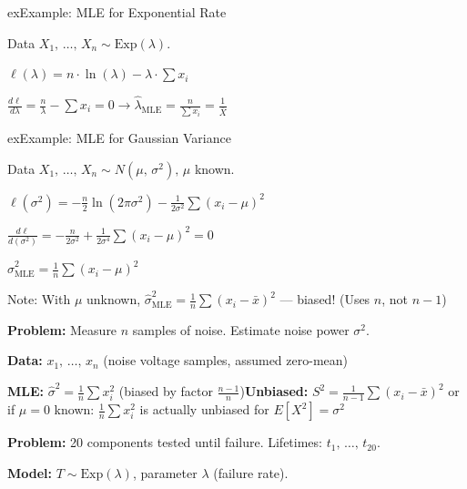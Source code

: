 \begin{PSbox}[unbreakable]{ex}{Example: MLE for Exponential Rate}

Data $X_{1},\, \ldots,\, X_{n} \sim \mathrm{Exp}(\lambda)$.

$\ell (\lambda) = n \cdot \ln (\lambda) - \lambda \cdot \sum x_{i}$

$\displaystyle \frac{d\ell}{d\lambda} = \frac{n}{\lambda} - \sum x_{i} = 0 \to \hat{\lambda}_{\mathrm{MLE}} = \frac{n}{\sum x_{i}} = \frac{1}{\bar{X}}$

\end{PSbox}

\begin{PSbox}[unbreakable]{ex}{Example: MLE for Gaussian Variance}

Data $X_{1},\, \ldots,\, X_{n} \sim N(\mu,\, \sigma^{2}),\, \mu$ known.

$\displaystyle \ell (\sigma^{2}) = -\frac{n}{2}\ln (2\pi \sigma^{2}) - \frac{1}{2\sigma^{2}}\sum (x_{i} - \mu)^{2}$

$\displaystyle \frac{d\ell}{d(\sigma^{2})} = -\frac{n}{2\sigma^{2}} + \frac{1}{2\sigma^{4}}\sum (x_{i} - \mu)^{2} = 0$

$\displaystyle \hat{\sigma}^{2}_{\mathrm{MLE}} = \frac{1}{n}\sum (x_{i} - \mu)^{2}$

Note: With $\mu$ unknown, $\hat{\sigma}^{2}_{\mathrm{MLE}} = \frac{1}{n}\sum (x_{i} - \bar{x})^{2}$ — biased! (Uses $n$, not $n-1$)

\end{PSbox}



\textbf{Problem:} Measure $n$ samples of noise. Estimate noise power $\sigma^{2}$.

\textbf{Data:} $x_{1},\, \ldots,\, x_{n}$ (noise voltage samples, assumed zero-mean)

\textbf{MLE:} $\hat{\sigma}^{2} = \frac{1}{n}\sum x_{i}^{2}$ (biased by factor $\frac{n-1}{n}$)\PSbr{}\textbf{Unbiased:} $S^{2} = \frac{1}{n-1}\sum (x_{i} - \bar{x})^{2}$ or if $\mu = 0$ known: $\frac{1}{n}\sum x_{i}^{2}$ is actually unbiased for $E[X^{2}] = \sigma^{2}$


\textbf{Problem:} 20 components tested until failure. Lifetimes: $t_{1},\, \ldots,\, t_{20}$.

\textbf{Model:} $T \sim \mathrm{Exp}(\lambda)$, parameter $\lambda$ (failure rate).

